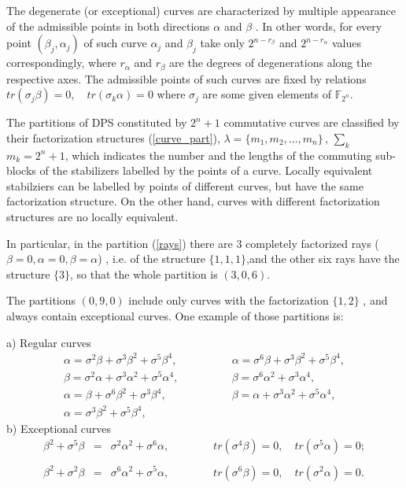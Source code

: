 \documentclass{article}
\begin{document}
The degenerate (or exceptional) curves are characterized by multiple
appearance of the admissible points in both directions $\alpha $ and $\beta $%
. In other words, for every point $(\beta _{j},\alpha _{j})$  of such curve $%
\alpha _{j}$ and $\beta _{j}$ take only $2^{n-r_{\beta }}$ and  $%
2^{n-r_{\alpha }}$ values correspondingly, where  $r_{\alpha }$ and $%
r_{\beta }$ are the degrees of degenerations along the respective axes. The
admissible points of such curves are fixed by relations $tr(\sigma _{j}\beta
)=0,\quad tr(\sigma _{k}\alpha )=0$ where $\sigma _{j}$ are some given
elements of $\mathbb{F}_{2^{n}}$.

The partitions of DPS constituted by  $2^{n}+1$ commutative curves are
classified by their factorization structures (\ref{curve_part}), $\lambda
=\{m_{1},m_{2},\ldots ,m_{n}\}\,$, $\sum_{k}$ $m_{k}=2^{n}+1$, which
indicates the number and the lengths of the commuting sub-blocks of the
stabilizers labelled by the points of a curve. Locally equivalent
stabilziers can be labelled by points of different curves, but  have the
same factorization structure. On the other hand, curves with different
factorization structures are no locally equivalent.

In particular, in the partition (\ref{rays}) there are $3$ completely
factorized rays ($\beta =0,\alpha =0,\beta =\alpha $) , i.e. of the
structure $\{1,1,1\}$,and the other six rays have the structure $\{3\}$, so
that the whole partition is  $(3,0,6)$. 

The partitions $(0,9,0)$ include only curves with the factorization $\{1,2\}$%
, and always contain exceptional curves. One example of those partitions is:

a) Regular curves 
\begin{equation}
\begin{array}{ll}
\alpha =\sigma ^{2}\beta +\sigma ^{3}\beta ^{2}+\sigma ^{5}\beta ^{4},\qquad
\qquad  & \alpha =\sigma ^{6}\beta +\sigma ^{3}\beta ^{2}+\sigma ^{5}\beta
^{4}, \\ 
\beta =\sigma ^{2}\alpha +\sigma ^{3}\alpha ^{2}+\sigma ^{5}\alpha
^{4},\qquad \qquad  & \beta =\sigma ^{6}\alpha ^{2}+\sigma ^{3}\alpha ^{4},
\\ 
\alpha =\beta +\sigma ^{6}\beta ^{2}+\sigma ^{3}\beta ^{4},\qquad \qquad  & 
\beta =\alpha +\sigma ^{3}\alpha ^{2}+\sigma ^{5}\alpha ^{4}, \\ 
\alpha =\sigma ^{3}\beta ^{2}+\sigma ^{5}\beta ^{4},\qquad \qquad  & 
\end{array}%
\end{equation}%
b) Exceptional curves 
\begin{eqnarray}
\beta ^{2}+\sigma ^{5}\beta  &=&\sigma ^{2}\alpha ^{2}+\sigma ^{6}\alpha
,\qquad \qquad tr(\sigma ^{4}\beta )=0,\quad tr(\sigma ^{5}\alpha )=0; 
\nonumber \\
&& \\
\beta ^{2}+\sigma ^{2}\beta  &=&\sigma ^{6}\alpha ^{2}+\sigma ^{5}\alpha
,\qquad \qquad tr(\sigma ^{6}\beta )=0,\quad tr(\sigma ^{2}\alpha )=0. 
\nonumber
\end{eqnarray}
\end{document}
